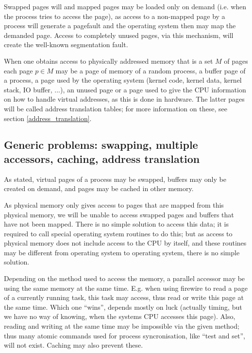 Swapped pages will and mapped pages may be loaded only on demand (i.e. when the
process tries to access the page), as access to a non-mapped page by a process
will generate a pagefault and the operating system then may map the demanded
page.  Access to completely unused pages, via this mechanism, will create the
well-known segmentation fault.

When one obtains access to physically addressed memory that is a set $M$ of
pages each page $p \in M$ may be a page of memory of a random process, a buffer
page of a process, a page used by the operating system (kernel code, kernel
data, kernel stack, IO buffer, ...), an unused page or a page used to give the
CPU information on how to handle virtual addresses, as this is done in hardware.
The latter pages will be called address translation tables; for more information
on these, see section \ref{address_translation}.

\subsection{Generic problems: swapping, multiple accessors, caching, address
translation}

As stated, virtual pages of a process may be swapped, buffers may only be
created on demand, and pages may be cached in other memory.

As physical memory only gives access to pages that are mapped from this
physical memory, we will be unable to access swapped pages and buffers that
have not been mapped. There is no simple solution to access this data; it is
required to call special operating system routines to do this; but as access to
physical memory does not include access to the CPU by itself, and these
routines may be different from operating system to operating system, there is
no simple solution.

Depending on the method used to access the memory, a parallel accessor may be
using the same memory at the same time. E.g. when using firewire to read a page
of a currently running task, this task may access, thus read or write this page
at the same time. Which one ``wins'', depends mostly on luck (actually timing,
but we have no way of knowing, when the systems CPU accesses this page). Also,
reading and writing at the same time may be impossible via the given method;
thus many atomic commands used for process syncronisation, like ``test and
set'', will not exist.  Caching may also prevent these.

